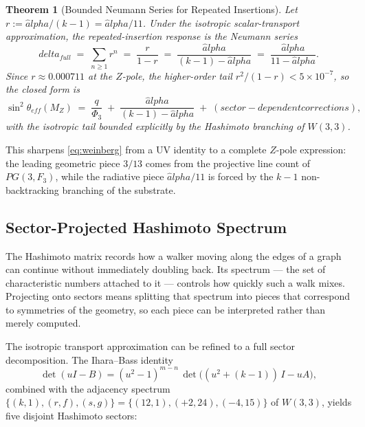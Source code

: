 \documentclass[12pt,a4paper]{article}
\def\mathbb#1{#1}%
\def\mathrm#1{#1}%
\def\text#1{#1}%
\def\alpha{alpha}%
\def\delta{delta}%
\def\Phi#1{Phi#1}%
\newtheorem{theorem}{Theorem}[section]
\theoremstyle{definition}
\newcommand{\PG}{\mathrm{PG}}
\newcommand{\FF}{\mathbb{F}}
\begin{document}
\begin{theorem}[Bounded Neumann Series for Repeated Insertions]
\label{thm:neumann-weinberg}
Let $r := \hat\alpha/(k-1) = \hat\alpha/11$.  Under the isotropic
scalar-transport approximation, the repeated-insertion response is
the Neumann series
\[
\delta_{\mathrm{full}}
\;=\; \sum_{n\ge 1} r^n
\;=\; \frac{r}{1-r}
\;=\; \frac{\hat\alpha}{(k-1) - \hat\alpha}
\;=\; \frac{\hat\alpha}{11 - \hat\alpha}.
\]
Since $r \approx 0.000711$ at the $Z$-pole, the higher-order tail
$r^2/(1-r) < 5 \times 10^{-7}$, so the closed form is
\[
\sin^2\theta_{\mathrm{eff}}(M_Z)
\;=\; \frac{q}{\Phi_3}
\;+\; \frac{\hat\alpha}{(k-1) - \hat\alpha}
\;+\; (\text{sector-dependent corrections}),
\]
with the isotropic tail bounded explicitly by the Hashimoto branching
of $W(3,3)$.
\end{theorem}

This sharpens \eqref{eq:weinberg} from a UV identity to a complete
$Z$-pole expression: the leading geometric piece $3/13$ comes from
the projective line count of $\PG(3,\FF_3)$, while the radiative
piece $\hat\alpha/11$ is forced by the $k-1$ non-backtracking
branching of the substrate.

\subsection{Sector-Projected Hashimoto Spectrum}

\begin{plainbox}
The Hashimoto matrix records how a walker moving along the edges of a graph can
continue without immediately doubling back. Its spectrum --- the set of characteristic
numbers attached to it --- controls how quickly such a walk mixes. Projecting onto sectors
means splitting that spectrum into pieces that correspond to symmetries of the geometry, so
each piece can be interpreted rather than merely computed.
\end{plainbox}

\label{sec:hashimoto-sector}

The isotropic transport approximation can be refined to a full sector
decomposition.  The Ihara--Bass identity
\[
\det(uI - B) = (u^2-1)^{m-n}\,\det\!\bigl((u^2 + (k-1))\,I - u A\bigr),
\]
combined with the adjacency spectrum $\{(k,1),(r,f),(s,g)\}
= \{(12,1),(+2,24),(-4,15)\}$ of $W(3,3)$, yields five disjoint
Hashimoto sectors:
\end{document}
